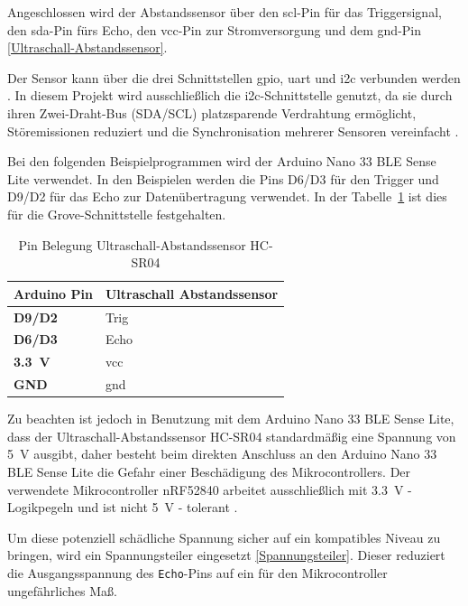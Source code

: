  Angeschlossen wird der Abstandssensor über den \ac{scl}-Pin für das Triggersignal, den \ac{sda}-Pin fürs Echo, den \ac{vcc}-Pin zur Stromversorgung und dem \ac{gnd}-Pin \ref{Ultraschall-Abstandssensor}. 
 
 Der Sensor kann über die drei Schnittstellen \ac{gpio}, \ac{uart} und \ac{i2c} verbunden werden \cite{Simac:2017}. In diesem Projekt wird ausschließlich die \ac{i2c}-Schnittstelle genutzt, da sie durch ihren Zwei-Draht-Bus (SDA/SCL) platzsparende Verdrahtung ermöglicht, Störemissionen reduziert und die Synchronisation mehrerer Sensoren vereinfacht \cite{Lee:2018}.


Bei den folgenden Beispielprogrammen wird der Arduino Nano 33 BLE Sense Lite verwendet. In den Beispielen werden die Pins D6/D3 für den Trigger und D9/D2 für das Echo zur Datenübertragung verwendet. In der Tabelle~\ref{PinBelegungUltraschall}  ist dies für die Grove-Schnittstelle festgehalten.

\begin{table}[h]
	\centering
	\renewcommand{\arraystretch}{1.5} %
	\setlength{\tabcolsep}{10pt} %
	\caption{Pin Belegung Ultraschall-Abstandssensor HC-SR04}
	\label{PinBelegungUltraschall}
	\begin{tabular}{|m{4cm}|m{6cm}|}
		\hline 
		\rowcolor{black!12}\textbf{Arduino Pin} & \textbf{Ultraschall Abstandssensor} \\ \hline
		\textbf{D9/D2} & Trig \\ \hline
		\textbf{D6/D3} & Echo \\ \hline
		\textbf{\SI{3.3}{\volt}} & \acs{vcc} \\ \hline
		\textbf{GND} & \acs{gnd} \\ \hline
	\end{tabular}
\end{table}

Zu beachten ist jedoch in Benutzung mit dem Arduino Nano 33 BLE Sense Lite, dass der Ultraschall-Abstandssensor HC-SR04 standardmäßig eine Spannung von \SI{5}{\volt} ausgibt, daher besteht beim direkten Anschluss an den Arduino Nano 33 BLE Sense Lite die Gefahr einer Beschädigung des Mikrocontrollers. Der verwendete Mikrocontroller nRF52840 arbeitet ausschließlich mit \SI{3.3}{\volt} - Logikpegeln und ist nicht \SI{5}{\volt} - tolerant \cite{Simac:2017}.

Um diese potenziell schädliche Spannung sicher auf ein kompatibles Niveau zu bringen, wird ein Spannungsteiler eingesetzt \ref{Spannungsteiler}. Dieser reduziert die Ausgangsspannung des \texttt{Echo}-Pins auf ein für den Mikrocontroller ungefährliches Maß.

